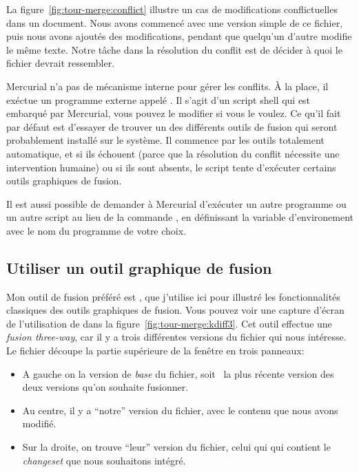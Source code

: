 La figure~\ref{fig:tour-merge:conflict} illustre un cas de modifications
conflictuelles dans un document. Nous avons commencé avec une version simple
de ce fichier, puis nous avons ajoutés des modifications, pendant que 
quelqu'un d'autre modifie le même texte. Notre tâche dans la résolution
du conflit est de décider à quoi le fichier devrait ressembler.

Mercurial n'a pas de mécanisme interne pour gérer les conflits. 
À la place, il exéctue un programme externe appelé .
Il s'agit d'un script shell qui est embarqué par Mercurial, vous
pouvez le modifier si vous le voulez. Ce qu'il fait par défaut est
d'essayer de trouver un des différents outils de fusion qui seront
probablement installé sur le système. Il commence par les outils
totalement automatique, et si ils échouent (parce que la résolution
du conflit nécessite une intervention humaine) ou si ils sont absents,
le script tente d'exécuter certains outils graphiques de fusion.

Il est aussi possible de demander à Mercurial d'exécuter un autre
programme ou un autre script au lieu de la commande ,
en définissant la variable d'environement  avec le nom
du programme de votre choix.

\subsection{Utiliser un outil graphique de fusion}

Mon outil de fusion préféré est , que j'utilise ici
pour illustré les fonctionnalités classiques des outils graphiques 
de fusion. Vous pouvez voir une capture d'écran de l'utilisation de 
 dans la figure~\ref{fig:tour-merge:kdiff3}. Cet outil
effectue une \emph{fusion \textit{three-way}}, car il y a trois différentes
versions du fichier qui nous intéresse. Le fichier découpe la partie
supérieure de la fenêtre en trois panneaux:

\begin{itemize}
\item A gauche on la version de \emph{base} du fichier, soit ~la plus 
  récente version des deux versions qu'on souhaite fusionner.
\item Au centre, il y a ``notre'' version du fichier, avec le contenu 
  que nous avons modifié.
\item Sur la droite, on trouve ``leur'' version du fichier, celui qui qui
  contient le \textit{changeset} que nous souhaitons intégré. 
\end{itemize}

